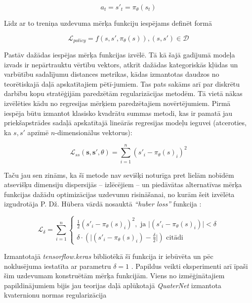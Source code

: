 \documentclass[12pt, a4paper]{article}
\numberwithin{equation}{section} %
\begin{document}
\begin{equation}
    a_t = s'_t = \pi_{\theta}(s_t)
\end{equation}

Līdz ar to treniņa uzdevuma mērķa funkciju iespējams definēt formā

\begin{equation}
    \mathcal{L}_{policy} = f \left (s,s',\pi_{\theta}(s) \right ), (s,s') \in \mathcal{D}
\end{equation}

Pastāv dažādas iespējas mērķa funkcijas izvēlē. Tā kā šajā gadījumā modeļa izvads ir nepārtrauktu vērtību vektors, atkrīt dažādas kategoriskās kļūdas un varbūtību sadalījumu distances metrikas, kādas izmantotas daudzos no teorētiskajā daļā apskatītajiem pētī-jumiem. Tas pats sakāms arī par diskrētu darbību kopu stratēģijām paredzētām regularizācijas metodēm. Tā vietā nākas izvēlēties kādu no regresijas mērķiem paredzētajiem novērtējumiem. Pirmā iespēja būtu izmantot klasisko kvadrātu summas metodi, kas ir pamatā jau priekšapstrādes sadaļā apskatītajā lineārās regresijas modeļu ieguvei (atceroties, ka $s, s'$ apzīmē $n$-dimensionālus vektorus):


\begin{equation}
    \mathcal{L}_{ss} ( \boldsymbol{s}, \boldsymbol{s'},\theta) = \sum_{i=1}^n (s'_i - \pi_{\theta}(s)_i)^2 
\end{equation}

Taču jau sen zināms, ka šī metode nav sevišķi noturīga pret lielām nobīdēm atsevišķu dimensiju dispersijās -- izlēcējiem -- un piedāvātas alternatīvas mērķa funkcijas dažādu optimizācijas uzdevumu risināšanai, no kurām šeit izvēlēta izgudrotāja P. Dž. Hūbera vārdā nosauktā \textit{``huber loss''} funkcija \cite{huber_loss}:


\begin{equation}
    \mathcal{L}_{\delta} =  \sum_{i=1}^n 
    \begin{cases}
    \frac{1}{2} (s'_i - \pi_{\theta}(s)_i)^2, \text{ ja } \vert (s'_i - \pi_{\theta}(s)_i) \vert < \delta \\
    \delta \cdot \left (  \vert (s'_i - \pi_{\theta}(s)_i) - \frac{\delta}{2} \vert  \right ) \text{ citādi}
    \end{cases}
\end{equation}


Izmantotajā \textit{tensorflow.keras} bibliotēkā šī funkcija ir iebūvēta un pēc noklusējuma iestatīta ar parametru $\delta = 1$ \cite{keras_huber}. Papildus veikti eksperimenti arī īpaši šim uzdevumam konstruētām mērķa funkcijām. Viens no izmēģinātajiem papildinājumiem bijis jau teorijas daļā aplūkotajā \textit{QuaterNet} izmantota kvaternionu normas regularizācija \cite{pavllo2018quaternet}
\end{document}
